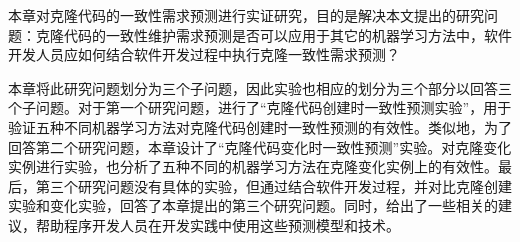 

本章对克隆代码的一致性需求预测进行实证研究，目的是解决本文提出的研究问题：克隆代码的一致性维护需求预测是否可以应用于其它的机器学习方法中，软件开发人员应如何结合软件开发过程中执行克隆一致性需求预测？

本章将此研究问题划分为三个子问题，因此实验也相应的划分为三个部分以回答三个子问题。对于第一个研究问题，进行了“克隆代码创建时一致性预测实验”，用于验证五种不同机器学习方法对克隆代码创建时一致性预测的有效性。类似地，为了回答第二个研究问题，本章设计了“克隆代码变化时一致性预测”实验。对克隆变化实例进行实验，也分析了五种不同的机器学习方法在克隆变化实例上的有效性。最后，第三个研究问题没有具体的实验，但通过结合软件开发过程，并对比克隆创建实验和变化实验，回答了本章提出的第三个研究问题。同时，给出了一些相关的建议，帮助程序开发人员在开发实践中使用这些预测模型和技术。


